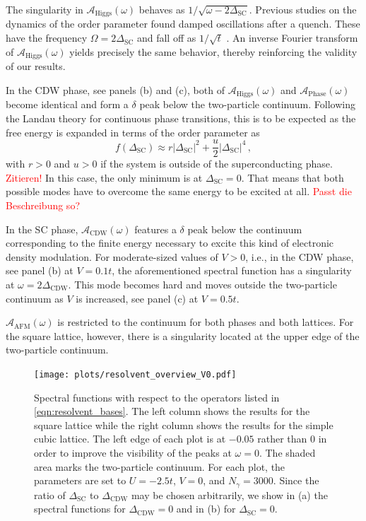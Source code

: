 \documentclass[
    reprint, 
    aps,
    preprintnumbers,
    twocolumn,
    prb,
    superscriptaddress
]{revtex4-2}
\newcommand{\spectral}[1]{\mathcal{A}_\text{#1}  (\omega)}
\begin{document}
The singularity in $\spectral{Higgs}$ behaves as $1/\sqrt{\omega - 2 \Delta_\text{SC}}$.
Previous studies on the dynamics of the order parameter found damped oscillations after a quench.
These have the frequency $\Omega = 2 \Delta_\text{SC}$ and fall off as $1/\sqrt{t}$ \cite{Yuzbashyan06}.
An inverse Fourier transform of $\spectral{Higgs}$ yields precisely the same behavior, thereby reinforcing the validity of our results.

In the CDW phase, see panels (b) and (c), both of $\spectral{Higgs}$ and $\spectral{Phase}$ become identical and form a $\delta$ peak below the two-particle continuum.
Following the Landau theory for continuous phase transitions, this is to be expected as the free energy is expanded in terms of the order parameter as
\begin{equation}
    f(\Delta_\text{SC}) \approx r |\Delta_\text{SC}|^2 + \frac{u}{2} |\Delta_\text{SC}|^4\,,
\end{equation}
with $r > 0$ and $u > 0$ if the system is outside of the superconducting phase. \textcolor{red}{Zitieren!}
In this case, the only minimum is at $\Delta_\text{SC} = 0$. 
That means that both possible modes have to overcome the same energy to be excited at all. \textcolor{red}{Passt die Beschreibung so?}

In the SC phase, $\spectral{CDW}$ features a $\delta$ peak below the continuum corresponding to the finite energy necessary to excite this kind of electronic density modulation.
For moderate-sized values of $V>0$, i.e., in the CDW phase, see panel (b) at $V=0.1t$, the aforementioned spectral function has a singularity at $\omega=2\Delta_\text{CDW}$.
This mode becomes hard and moves outside the two-particle continuum as $V$ is increased, see panel (c) at $V=0.5t$.

$\spectral{AFM}$ is restricted to the continuum for both phases and both lattices.
For the square lattice, however, there is a singularity located at the upper edge of the two-particle continuum.


\begin{figure}
    \centering
    \texttt{[image: plots/resolvent\_overview\_V0.pdf]}
    \caption{Spectral functions with respect to the operators listed in \eqref{eqn:resolvent_bases}.
    The left column shows the results for the square lattice while the right column shows the results for the simple cubic lattice.
    The left edge of each plot is at $-0.05$ rather than $0$ in order to improve the visibility of the peaks at $\omega=0$.
    The shaded area marks the two-particle continuum.
    For each plot, the parameters are set to $U=-2.5t$, $V=0$, and $N_\gamma = 3000$.
    Since the ratio of $\Delta_\text{SC}$ to $\Delta_\text{CDW}$ may be chosen arbitrarily, we show in (a) the spectral functions for $\Delta_\text{CDW} = 0$ and in (b) for $\Delta_\text{SC} = 0$.}
    \label{fig:resolvent_overview_V0}
\end{figure}
\end{document}
